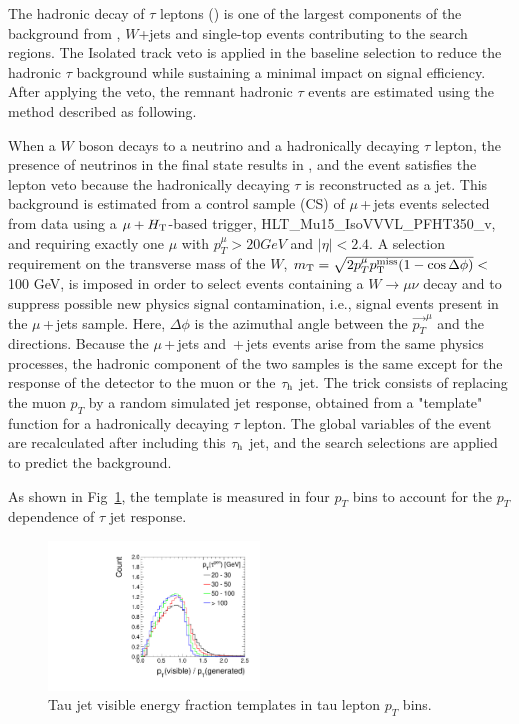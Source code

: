 The hadronic decay of $\tau$ leptons (\tauh) is one of the largest components of the background from \ttbar , $W$+jets and single-top events contributing to the search regions. The Isolated track veto is applied in the baseline selection to reduce the hadronic $\tau$ background while sustaining a minimal impact on signal efficiency. After applying the veto, the remnant hadronic $\tau$ events are estimated using the method described as following.

When a $W$ boson decays to a neutrino and a hadronically decaying $\tau$ lepton, the presence of neutrinos in the final state results in \MET, and the event satisfies the lepton veto because the hadronically decaying $\tau$ is reconstructed as a jet. This background is estimated from a control sample (CS) of $\mu$\,+\,jets 
events selected from data using a $\mu+H_{\mathrm{T}}$-based trigger, 
HLT\_Mu15\_IsoVVVL\_PFHT350\_v, and requiring exactly one 
$\mu$ with $p_{T}^{\mu}>20 GeV$ and $|\eta|<2.4$.
A selection requirement on the transverse mass of the $W$, 
$m_\mathrm{T}=\sqrt{2p_{T}^{\mu}p^{\rm miss}_{\rm T}(1-\cos\Delta\phi)}<$ 100 GeV, 
is imposed in order 
to select events containing a $W\to\mu\nu$ decay and to suppress 
possible new physics signal contamination, i.e., signal events
present in the $\mu$\,+\,jets sample. Here,
$\Delta\phi$ is the azimuthal angle between the $\vec{p_{T}}^\mu$ and the 
\MET directions.
Because the $\mu$\,+\,jets and \tauh{}\,+\,jets events arise from the same 
physics processes, the hadronic component of the two samples is the same 
except for the response of the detector to the muon or the $\tau_\mathrm{h}$ jet. 
The trick consists of replacing the muon $p_{T}$ by a random
simulated \tauh jet response, obtained from a "template" function for a 
hadronically decaying $\tau$ lepton. The 
global variables of the event are recalculated after including this $\tau_\mathrm{h}$ jet, and the 
search selections are applied to predict the \tauh background.

As shown in Fig~\ref{fig:templates}, the template is measured in four $p_{T}$ bins to account for the $p_{T}$ dependence of $\tau$ jet response.

\begin{figure}[htbp]
\centering
\includegraphics[width=0.5\textwidth]{sections/mc4/Backgrounds/HadTau/figures/TauResponseTemplate.pdf}
\caption{Tau jet visible energy fraction templates in tau lepton $p_{T}$ bins.}
\label{fig:templates}
\end{figure}

